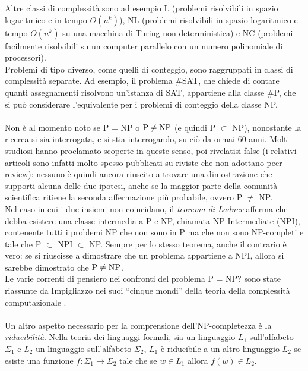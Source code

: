 Altre classi di complessità sono ad esempio L (problemi risolvibili in spazio logaritmico e in tempo $O(n^k)$), NL (problemi 
risolvibili in spazio logaritmico e tempo $O(n^k)$ su una macchina di Turing non deterministica) e NC (problemi facilmente
risolvibili su un computer parallelo con un numero polinomiale di processori).\\
Problemi di tipo diverso, come quelli di conteggio, sono raggruppati in classi di complessità separate. Ad esempio, 
il problema \#SAT, che chiede di contare quanti assegnamenti risolvono un'istanza di SAT, appartiene alla classe \#P,
che si può considerare l'equivalente per i problemi di conteggio della classe NP.\\
\\
Non è al momento noto se P = NP o $\textnormal{P} \neq \textnormal{NP}$ (e quindi P $\subset$ NP), nonostante la ricerca si sia interrogata,
e si stia interrogando, su ciò da ormai 60 anni. Molti studiosi hanno proclamato scoperte in queste senso,
poi rivelatisi false \cite{PvsNP-public-shame} (i relativi articoli sono infatti molto spesso pubblicati su riviste 
che non adottano peer-review): nessuno è quindi ancora riuscito
a trovare una dimostrazione che supporti alcuna delle due ipotesi,
anche se la maggior parte della comunità scientifica ritiene la seconda affermazione più probabile, ovvero P $\neq$ NP.\\
Nel caso in cui i due insiemi non coincidano, il \textit{teorema di Ladner} \cite{ladner-theorem} afferma che debba esistere una classe intermedia a 
P e NP, chiamata NP-Intermediate (NPI), contenente tutti i problemi NP che non sono in P ma che non sono NP-completi e tale 
che P $\subset$ NPI $\subset$ NP. Sempre per lo stesso teorema, anche il contrario è vero: se si riuscisse a dimostrare che un
problema appartiene a NPI, allora si sarebbe dimostrato che $\textnormal{P} \neq \textnormal{NP}$.\\
Le varie correnti di pensiero nei confronti del problema P = NP? sono state riassunte da Impigliazzo nei suoi “cinque mondi”
della teoria della complessità computazionale \cite{impagliazzo-five-worlds}.\\
\\
Un altro aspetto necessario per la comprensione dell'NP-completezza è la \textit{riducibilità}. Nella teoria dei linguaggi formali,
sia un linguaggio $L_1$ sull'alfabeto $\Sigma_1$ e $L_2$ un linguaggio sull'alfabeto $\Sigma_2$,
$L_1$ è riducibile a un altro linguaggio $L_2$ se esiste una funzione $f: \Sigma_1 \rightarrow \Sigma_2$ tale che se $w \in L_1$ allora $f(w) \in L_2$.
